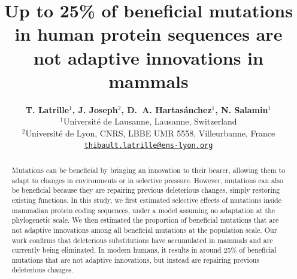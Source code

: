\documentclass{article}
\title{Up to 25\% of beneficial mutations in human protein sequences are not adaptive innovations in mammals}
\author{
    \large
    \textbf{T. {Latrille}$^{1}$, J. {Joseph}$^{2}$, D.~A. {Hartasánchez}$^{1}$, N. {Salamin}$^{1}$}\\
    \normalsize
    $^{1}$Université de Lausanne, Lausanne, Switzerland\\
    $^{2}$Université de Lyon, CNRS, LBBE UMR 5558, Villeurbanne, France \\
    \texttt{\href{mailto:thibault.latrille@ens-lyon.org}{thibault.latrille@ens-lyon.org}} \\
}
\begin{document}
    \maketitle

    \begin{abstract}
        Mutations can be beneficial by bringing an innovation to their bearer, allowing them to adapt to changes in environments or in selective pressure. However, mutations can also be beneficial because they are repairing previous deleterious changes, simply restoring existing functions. In this study, we first estimated selective effects of mutations inside mammalian protein coding sequences, under a model assuming no adaptation at the phylogenetic scale. We then estimated the proportion of beneficial mutations that are not adaptive innovations among all beneficial mutations at the population scale. Our work confirms that deleterious substitutions have accumulated in mammals and are currently being eliminated. In modern humans, it results in around 25\% of beneficial mutations that are not adaptive innovations, but instead are repairing previous deleterious changes.
    \end{abstract}

\end{document}
